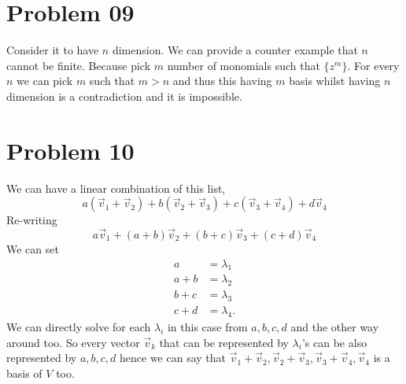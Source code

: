 \documentclass[letter]{article}
\begin{document}
\section*{Problem 09}
Consider it to have $n$ dimension. We can provide a counter example that $n$ cannot be finite. Because pick $m$ number of monomials such that $\{z^{m}\} $. For every $n$ we can pick $m$ such that $m > n$ and thus this having  $m$ basis whilst having $n$ dimension is a contradiction and it is impossible. 

\section*{Problem 10} 
We can have a linear combination of this list, 
\[
a (\vec{v}_1 + \vec{v}_2) + b (\vec{v}_2 + \vec{v}_3) + c (\vec{v}_3 + \vec{v}_4) + d \vec{v}_4
\] 
Re-writing
\[
a \vec{v}_1 + (a+b)\vec{v}_2 + (b+c) \vec{v}_3 + (c+d)\vec{v}_4
\]
We can set 
\begin{align*}
	a &= \lambda_1 \\
	a+b &= \lambda_2 \\
	b+c &= \lambda_3 \\
	c+d &= \lambda_4 
.\end{align*}
We can directly solve for each $\lambda_i$ in this case from $a,b,c,d$ and the other way around too. So every vector  $\vec{v}_k$ that can be represented by $\lambda_i$'s can be also represented by $a,b,c,d$ hence we can say that $\vec{v}_1+\vec{v}_2, \vec{v}_2 + \vec{v}_3, \vec{v}_3 + \vec{v}_4, \vec{v}_4$ is a basis of $V$ too. 
\end{document}

